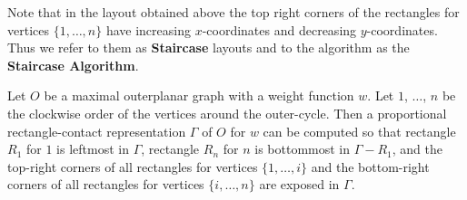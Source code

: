 \documentclass{llncs}
\newenvironment{sketch}{\medskip\noindent{\bf Proof Sketch:}}{\mbox{}\hfill\qed\par}
\begin{document}
 Note that in the layout obtained above
the top right corners of the rectangles for vertices $\{1, \ldots, n\}$
 have increasing $x$-coordinates and decreasing
 $y$-coordinates. Thus we refer to them as \textbf{Staircase} layouts
 and to the algorithm as the \textbf{Staircase
 Algorithm}. 


\begin{lemma}
\label{lem:double-stair}
	Let $O$ be a maximal outerplanar graph with a weight function $w$. Let
	$1$, $\ldots$, $n$ be the clockwise order of the vertices
        around the outer-cycle.
Then a proportional rectangle-contact representation  $\Gamma$ of $O$
for $w$ can be computed so that rectangle $R_1$ for $1$ is
leftmost in $\Gamma$, rectangle $R_n$ for $n$ is bottommost in
$\Gamma-R_1$, and the top-right corners of all rectangles
	for vertices $\{1, \ldots, i\}$ and the bottom-right corners of all rectangles for vertices
	$\{i, \ldots, n\}$ are exposed in $\Gamma$.
\end{lemma}
\begin{comment}
\begin{figure}[t]
\centering
	\texttt{[image: double-stair]}\\
	(a)\hspace{0.2\textwidth}(b)\hspace{0.22\textwidth}(c)
	\hspace{0.2\textwidth}(d)\hspace{0.05\textwidth}
	\caption{Illustration for the proof of Lemma~\ref{lem:double-stair}.}
\label{fig:double-stair}
\end{figure}

\begin{sketch}
Computing $\Gamma$ is easy when $G$ is a single edge $(1,n)$, so let
 $G$ have at least 3 vertices and $x$ be the unique vertex adjacent to $(1,n)$. Define the two
 graphs $G[1,x]$ and $G[x,n]$ as in the proof of Lemma~\ref{lem:stair}; see Fig.~\ref{fig:double-stair}(a).
If $x>i$, then recursively draw $G[1,x]$ and remove the rectangles for $1$ and $x$ from it;
 call the result $\Gamma_1$. Draw $G[x,n]$ using the \textbf{Staircase Algorithm} and remove
 $x$ and $n$ to find $\Gamma_2$. Now draw three mutually touching rectangles $R_1$, $R_x$
 and $R_n$ for $1$, $x$ and $n$, with the necessary areas and place $\Gamma_1$
 (after possible scaling)  between $R_1$, $R_x$ and $\Gamma_2$ (after $90^{\circ}$ clockwise
 rotation and possible scaling) between $R_x$, $R_n$ to complete the drawing; see
 Fig.~\ref{fig:double-stair}(b). The cases when $x=i$ and $x<i$ follow similar constructions;
 see Fig.~\ref{fig:double-stair}(c)--(d).
\end{sketch}
\end{comment}
\end{document}
